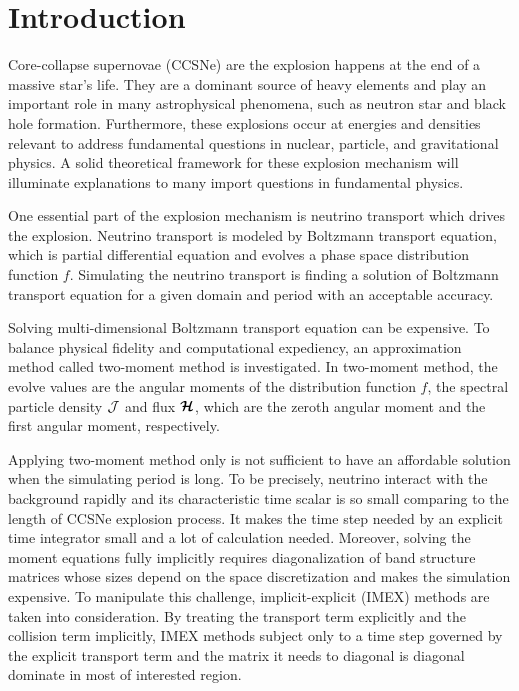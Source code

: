 \section{Introduction}

Core-collapse supernovae (CCSNe) are the explosion happens at the end of a massive star's life.
They are a dominant source of heavy elements and play an important role in many astrophysical phenomena, such as neutron star and black hole formation.  
Furthermore, these explosions occur at energies and densities relevant to address fundamental questions in nuclear, particle, and gravitational physics. 
A solid theoretical framework for these explosion mechanism will illuminate explanations to many import questions in fundamental physics.

One essential part of the explosion mechanism is neutrino transport which drives the explosion.  
Neutrino transport is modeled by Boltzmann transport equation, which is partial differential equation and evolves a phase space distribution function $f$.
Simulating the neutrino transport is finding a solution of Boltzmann transport equation for a given domain and period with an acceptable accuracy.

Solving multi-dimensional Boltzmann transport equation can be expensive.
To balance physical fidelity and computational expediency, an approximation method called two-moment method is investigated.
In two-moment method, the evolve values are the angular moments of the distribution function $f$, the spectral particle density $\mathcal{J}$ and flux $\boldsymbol{\mathcal{H}}$, which are the zeroth angular moment and the first angular moment, respectively.

Applying two-moment method only is not sufficient to have an affordable solution when the simulating period is long.
To be precisely, neutrino interact with the background rapidly and its characteristic time scalar is so small comparing to the length of CCSNe explosion process. 
It makes the time step needed by an explicit time integrator small and a lot of calculation needed. 
Moreover, solving the moment equations fully implicitly requires diagonalization of band structure matrices whose sizes depend on the space discretization and makes the simulation expensive.
To manipulate this challenge, implicit-explicit (IMEX) methods are taken into consideration.
By treating the transport term explicitly and the collision term implicitly, IMEX methods subject only to a time step governed by the explicit transport term and the matrix it needs to diagonal is diagonal dominate in most of interested region.

